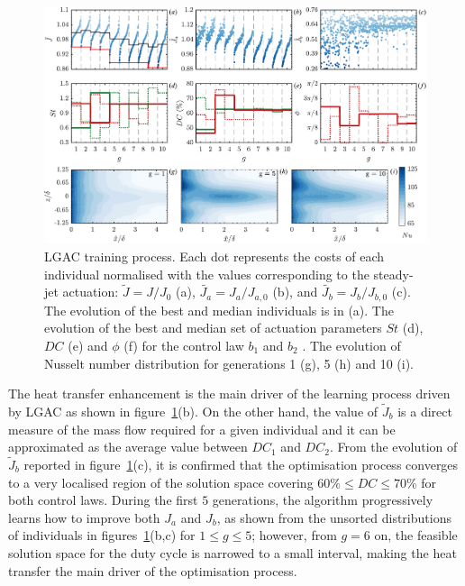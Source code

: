 \begin{figure}[t] %
    \centering
    \includegraphics[width=0.99\linewidth]{figures/F7.pdf}
    \caption{LGAC training process. Each dot represents the costs of each individual normalised with the values corresponding to the steady-jet actuation: $\tilde{J} = J/J_\mathrm{0}$ (a), $\tilde{J_a} = J_a/J_{a,0}$ (b), and $\tilde{J_b} = J_b/J_{b,0}$ (c). The evolution of the best  and median  individuals is in (a).
    The evolution of the best  and median  set of actuation parameters $St$ (d), $DC$ (e)  and $\phi$ (f) for the control law $b_1$  and $b_2$ . 
    The evolution of Nusselt number distribution for generations 1 (g), 5 (h) and 10 (i).}
    \label{fig:LGAC_progress}
\end{figure}

The heat transfer enhancement is the main driver of the learning process driven by LGAC as shown in figure~\ref{fig:LGAC_progress}(b). On the other hand, the value of $\tilde{J}_b$ is a direct measure of the mass flow required for a given individual and it can be approximated as the average value between $DC_1$ and $DC_2$. From the evolution of $\tilde{J}_b$ reported in figure~\ref{fig:LGAC_progress}(c), it is confirmed that the optimisation process converges to a very localised region of the solution space covering $60\%\leq DC \leq 70\%$ for both control laws. During the first $5$ generations, the algorithm progressively learns how to improve both $J_a$ and $J_b$, as shown from the unsorted distributions of individuals in figures~\ref{fig:LGAC_progress}(b,c) for $1\leq g \leq 5$; however, from $g=6$ on, the feasible solution space for the duty cycle is narrowed to a small interval, making the heat transfer the main driver of the optimisation process. 

